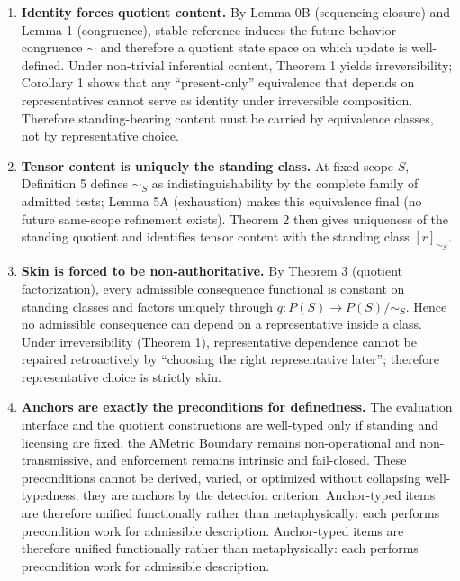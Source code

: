 \documentclass[12pt]{article}
\theoremstyle{plain}
\begin{document}
\begin{enumerate}[leftmargin=*]
\item \textbf{Identity forces quotient content.} By Lemma 0B (sequencing closure) and Lemma 1 (congruence), stable reference induces the future-behavior congruence $\sim$ and therefore a quotient state space on which update is well-defined. Under non-trivial inferential content, Theorem 1 yields irreversibility; Corollary 1 shows that any ``present-only'' equivalence that depends on representatives cannot serve as identity under irreversible composition. Therefore standing-bearing content must be carried by equivalence classes, not by representative choice.

\item \textbf{Tensor content is uniquely the standing class.} At fixed scope $S$, Definition 5 defines $\sim_S$ as indistinguishability by the complete family of admitted tests; Lemma 5A (exhaustion) makes this equivalence final (no future same-scope refinement exists). Theorem 2 then gives uniqueness of the standing quotient and identifies tensor content with the standing class $[r]_{\sim_S}$.

\item \textbf{Skin is forced to be non-authoritative.} By Theorem 3 (quotient factorization), every admissible consequence functional is constant on standing classes and factors uniquely through $q:P(S)\to P(S)/\sim_S$. Hence no admissible consequence can depend on a representative inside a class. Under irreversibility (Theorem 1), representative dependence cannot be repaired retroactively by ``choosing the right representative later''; therefore representative choice is strictly skin.

\item \textbf{Anchors are exactly the preconditions for definedness.} The evaluation interface and the quotient constructions are well-typed only if standing and licensing are fixed, the AMetric Boundary remains non-operational and non-transmissive, and enforcement remains intrinsic and fail-closed. These preconditions cannot be derived, varied, or optimized without collapsing well-typedness; they are anchors by the detection criterion. Anchor-typed items are therefore unified functionally rather than metaphysically: each performs precondition work for admissible description. Anchor-typed items are therefore unified functionally rather than metaphysically: each performs precondition work for admissible description.
\end{enumerate}
\end{document}
